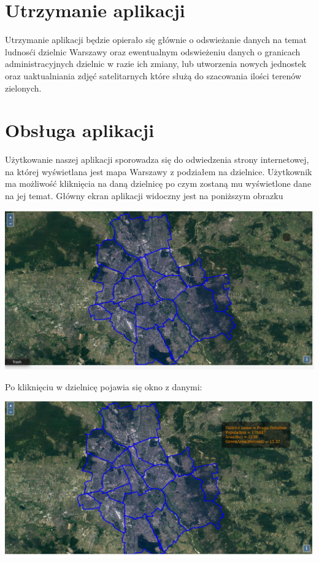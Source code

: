 \documentclass[11pt]{article}
\begin{document}
	\section{Utrzymanie aplikacji}
		Utrzymanie aplikacji będzie opierało się głównie o odswieżanie danych na temat ludnosći dzielnic Warszawy oraz ewentualnym odswieżeniu danych o granicach administracyjnych dzielnic w razie ich zmiany, lub utworzenia nowych jednostek oraz uaktualniania zdjęć satelitarnych które służą do szacowania ilości terenów zielonych.
		
		
		\section{Obsługa aplikacji}
		Użytkowanie naszej aplikacji sporowadza się do odwiedzenia strony internetowej, na której wyświetlana jest mapa Warszawy z podziałem na dzielnice. Użytkownik ma możliwość kliknięcia na daną dzielnicę po czym zostaną mu wyświetlone dane na jej temat. Główny ekran aplikacji widoczny jest na poniższym obrazku
		
\includegraphics[scale=0.4]{app_main_screen} 

Po kliknięciu w dzielnicę pojawia się okno z danymi:

\includegraphics[scale=0.4]{app_working}
\end{document}
